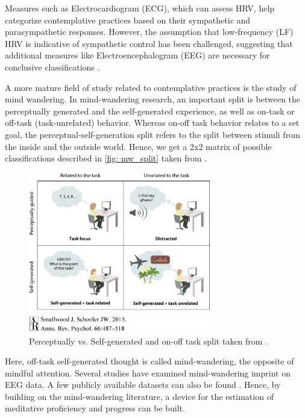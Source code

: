 Measures such as Electrocardiogram (ECG), which can assess HRV, help categorize contemplative practices based on their sympathetic and parasympathetic responses. However, the assumption that low-frequency (LF) HRV is indicative of sympathetic control has been challenged, suggesting that additional measures like Electroencephalogram (EEG) are necessary for conclusive classifications \cite{reyes2013utility}\cite{valenza2016disentanglement}.

A more mature field of study related to contemplative practices is the study of mind wandering. In mind-wandering research, an important split is between the perceptually generated and the self-generated experience, as well as on-task or off-task (task-unrelated) behavior. Whereas on-off task behavior relates to a set goal, the perceptual-self-generation split refers to the split between stimuli from the inside and the outside world. Hence, we get a 2x2 matrix of possible classifications described in \autoref{fig: mw_split} taken from \cite{SmallwoodSchooler2015}. 
\begin{figure}[H]
    \centering
    \includegraphics[width=300px]{Figures/mw_split.png}
    \caption{Perceptually vs. Self-generated and on-off task split taken from \cite{SmallwoodSchooler2015}.}
    \label{fig: mw_split}
\end{figure}

Here, off-task self-generated thought is called mind-wandering, the opposite of mindful attention. Several studies have examined mind-wandering imprint on EEG data\cite{Kam2011}. A few publicly available datasets can also be found \cite{Jin2019PredictingMW}\cite{DelormeEEGMeditationStudy}\cite{Rodriguez-Larios2020}\cite{DelormeEGGMeditationThinking}. Hence, by building on the mind-wandering literature, a device for the estimation of meditative proficiency and progress can be built.




